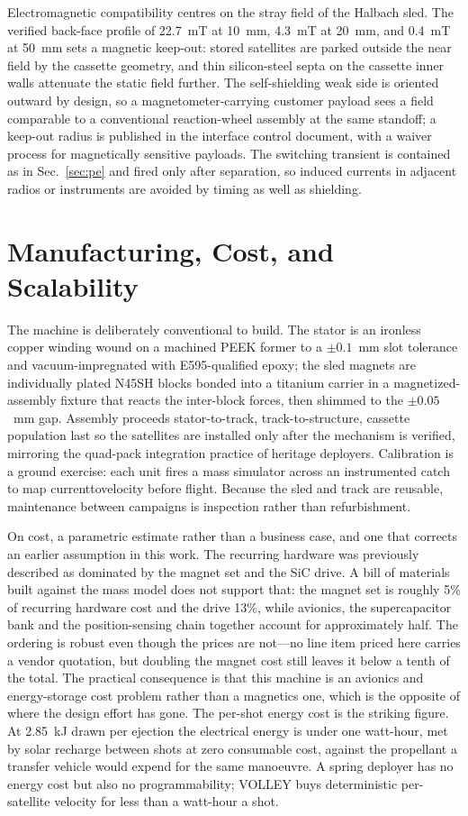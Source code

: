 \documentclass[conference]{IEEEtran}
\begin{document}
Electromagnetic compatibility centres on the stray field of the Halbach sled. The verified back-face profile of 22.7~mT at 10~mm, 4.3~mT at 20~mm, and 0.4~mT at 50~mm sets a magnetic keep-out: stored satellites are parked outside the near field by the cassette geometry, and thin silicon-steel septa on the cassette inner walls attenuate the static field further. The self-shielding weak side is oriented outward by design, so a magnetometer-carrying customer payload sees a field comparable to a conventional reaction-wheel assembly at the same standoff; a keep-out radius is published in the interface control document, with a waiver process for magnetically sensitive payloads. The switching transient is contained as in Sec.~\ref{sec:pe} and fired only after separation, so induced currents in adjacent radios or instruments are avoided by timing as well as shielding.

\section{Manufacturing, Cost, and Scalability}\label{sec:mfg}
The machine is deliberately conventional to build. The stator is an ironless copper winding wound on a machined PEEK former to a $\pm0.1$~mm slot tolerance and vacuum-impregnated with E595-qualified epoxy; the sled magnets are individually plated N45SH blocks bonded into a titanium carrier in a magnetized-assembly fixture that reacts the inter-block forces, then shimmed to the $\pm0.05$~mm gap. Assembly proceeds stator-to-track, track-to-structure, cassette population last so the satellites are installed only after the mechanism is verified, mirroring the quad-pack integration practice of heritage deployers. Calibration is a ground exercise: each unit fires a mass simulator across an instrumented catch to map current\-to\-velocity before flight. Because the sled and track are reusable, maintenance between campaigns is inspection rather than refurbishment.

On cost, a parametric estimate rather than a business case, and one that corrects an earlier assumption in this work. The recurring hardware was previously described as dominated by the magnet set and the SiC drive. A bill of materials built against the mass model does not support that: the magnet set is roughly 5\% of recurring hardware cost and the drive 13\%, while avionics, the supercapacitor bank and the position-sensing chain together account for approximately half. The ordering is robust even though the prices are not---no line item priced here carries a vendor quotation, but doubling the magnet cost still leaves it below a tenth of the total. The practical consequence is that this machine is an avionics and energy-storage cost problem rather than a magnetics one, which is the opposite of where the design effort has gone. The per-shot energy cost is the striking figure. At 2.85~kJ drawn per ejection the electrical energy is under one watt-hour, met by solar recharge between shots at zero consumable cost, against the propellant a transfer vehicle would expend for the same manoeuvre. A spring deployer has no energy cost but also no programmability; VOLLEY buys deterministic per-satellite velocity for less than a watt-hour a shot.
\end{document}
